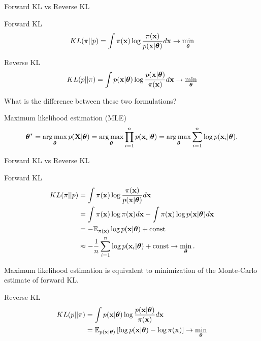 \begin{frame}{Forward KL vs Reverse KL}
	\begin{block}{Forward KL}
		\vspace{-0.2cm}
		\[
		KL(\pi || p) = \int \pi (\mathbf{x}) \log \frac{\pi(\mathbf{x})}{p(\mathbf{x} | \boldsymbol{\theta})} d \mathbf{x} \rightarrow \min_{\boldsymbol{\theta}}
		\]
	\end{block}
	\begin{block}{Reverse KL}
		\vspace{-0.2cm}
		\[
		KL(p || \pi) = \int p (\mathbf{x}| \boldsymbol{\theta}) \log \frac{p(\mathbf{x}| \boldsymbol{\theta})}{\pi(\mathbf{x})} d \mathbf{x} \rightarrow \min_{\boldsymbol{\theta}}
		\]
	\end{block}
	What is the difference between these two formulations?
	
	\begin{block}{Maximum likelihood estimation (MLE)}
		\vspace{-0.5cm}
		\[
		\boldsymbol{\theta}^* = \operatorname*{arg\,max}_{\boldsymbol{\theta}} p(\mathbf{X} | \boldsymbol{\theta}) = \operatorname*{arg\,max}_{\boldsymbol{\theta}} \prod_{i=1}^n p(\mathbf{x}_i | \boldsymbol{\theta}) = \operatorname*{arg\,max}_{\boldsymbol{\theta}} \sum_{i=1}^n \log p(\mathbf{x}_i | \boldsymbol{\theta}).
		\]
		\vspace{-0.1cm}
	\end{block}
\end{frame}
\begin{frame}{Forward KL vs Reverse KL}
	\begin{block}{Forward KL}
		\vspace{-0.5cm}
		\begin{align*}
			KL(\pi || p) &= \int \pi (\mathbf{x}) \log \frac{\pi(\mathbf{x})}{p(\mathbf{x} | \boldsymbol{\theta})} d \mathbf{x} \\
			&= \int \pi (\mathbf{x}) \log \pi(\mathbf{x}) d \mathbf{x} - \int \pi (\mathbf{x}) \log p(\mathbf{x} | \boldsymbol{\theta}) d \mathbf{x} \\
			&= - \mathbb{E}_{\pi(\mathbf{x})} \log p(\mathbf{x} | \boldsymbol{\theta}) + \text{const} \\
			& \approx - \frac{1}{n} \sum_{i=1}^n \log p(\mathbf{x}_i | \boldsymbol{\theta}) + \text{const} \rightarrow \min_{\boldsymbol{\theta}}.
		\end{align*}
		\vspace{-0.5cm}
	\end{block}
	Maximum likelihood estimation is equivalent to minimization of the Monte-Carlo estimate of forward KL.
	\begin{block}{Reverse KL}
		\vspace{-0.5cm}
		\begin{align*}
			KL(p || \pi) &= \int p(\mathbf{x} | \boldsymbol{\theta}) \log \frac{p(\mathbf{x} | \boldsymbol{\theta})}{\pi(\mathbf{x})} d \mathbf{x} \\
			&= \mathbb{E}_{p(\mathbf{x} | \boldsymbol{\theta})} \left[\log p(\mathbf{x} | \boldsymbol{\theta}) - \log \pi(\mathbf{x})\right] \rightarrow \min_{\boldsymbol{\theta}}
		\end{align*}
		\vspace{-0.7cm}
	\end{block}
\end{frame}
